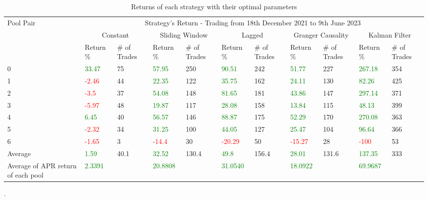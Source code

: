 \begin{table}[!htb]
    \centering
    \begin{adjustwidth}{-0.8in}{-0.9in}
        \begin{tabular}{|p{4em}|p{3em}|p{3em}|p{3em}|p{3em}|p{3em}|p{3em}|p{3em}|p{3em}|p{3em}|p{3em}|}\hline
            Pool Pair & \multicolumn{10}{|c|}{Strategy's Return - Trading from 18th December 2021 to 9th June 2023} \\\cline{2-11}
            & \multicolumn{2}{|c|}{Constant} & \multicolumn{2}{|c|}{Sliding Window} & \multicolumn{2}{|c|}{Lagged} & \multicolumn{2}{|c|}{Granger Causality} & \multicolumn{2}{|c|}{Kalman Filter}\\\cline{2-11}
            & Return \% & \# of Trades & Return \% & \# of Trades & Return \% & \# of Trades & Return \% & \# of Trades & Return \% & \# of Trades\\\hline
            0 & \textcolor{green}{33.47} & 75 & \textcolor{green}{57.95} & 250 & \textcolor{green}{90.51} & 242 & \textcolor{green}{51.77} & 227 & \textcolor{green}{267.18} & 354\\\cline{2-11}
            1 & \textcolor{red}{-2.46} & 44 & \textcolor{green}{22.35} & 122 & \textcolor{green}{35.75} & 162 & \textcolor{green}{24.11} & 130 & \textcolor{green}{82.26} & 425\\\cline{2-11}
            2 & \textcolor{red}{-3.5} & 37 & \textcolor{green}{54.08} & 148 & \textcolor{green}{81.65} & 181 & \textcolor{green}{43.86} & 147 & \textcolor{green}{297.14} & 371\\\cline{2-11}
            3 & \textcolor{red}{-5.97} & 48 & \textcolor{green}{19.87} & 117 & \textcolor{green}{28.08} & 158 & \textcolor{green}{13.84} & 115 & \textcolor{green}{48.13} & 399\\\cline{2-11}
            4 & \textcolor{green}{6.45} & 40 & \textcolor{green}{56.57} & 146 & \textcolor{green}{88.87} & 175 & \textcolor{green}{52.29} & 170 & \textcolor{green}{270.08} & 363\\\cline{2-11}
            5 & \textcolor{red}{-2.32} & 34 & \textcolor{green}{31.25} & 100 & \textcolor{green}{44.05} & 127 & \textcolor{green}{25.47} & 104 & \textcolor{green}{96.64} & 366\\\cline{2-11}
            6 & \textcolor{red}{-1.65} & 3 & \textcolor{red}{-14.4} & 30 & \textcolor{red}{-20.29} & 50 & \textcolor{red}{-15.27} & 28 & \textcolor{red}{-100} & 53\\\hline\hline            
            Average & \textcolor{green}{1.59} & 40.1 & \textcolor{green}{32.52} & 130.4 & \textcolor{green}{49.8} & 156.4 & \textcolor{green}{28.01} & 131.6 & \textcolor{green}{137.35} & 333\\\hline            
            Average of APR return of each pool & \textcolor{green}{2.3391} &  & \textcolor{green}{20.8808} &   & \textcolor{green}{31.0540} &  & \textcolor{green}{18.0922} &  & \textcolor{green}{69.9687} & \\\hline            
        \end{tabular}
    \end{adjustwidth}
    \caption{Returns of each strategy with their optimal parameters \label{tab:FinalResults}}.
\end{table}

